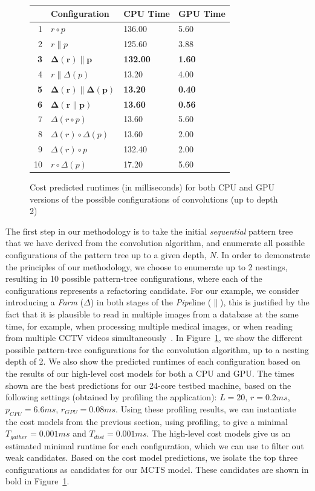 \documentclass[smallextended]{svjour3}
\begin{document}
\begin{figure}
\begin{center}
\begin{tabular}{| r | l | l | l |}
\hline
 & Configuration & CPU Time & GPU Time \tabularnewline
\hline
\hline
1 & $ r \circ p $ & 136.00 & 5.60  \tabularnewline
\hline
2 & $r \parallel p$ & 125.60 & 3.88 \tabularnewline
\hline
\textbf{3} & $ \mathbf{\Delta(r) \parallel p}$ & \textbf{132.00} & \textbf{1.60} \tabularnewline
\hline
4 & $ r \parallel \Delta(p)$ & 13.20 & 4.00 \tabularnewline
\hline
\textbf{5} & $\mathbf{\Delta(r) \parallel \Delta(p)}$ & \textbf{13.20} & \textbf{0.40}  \tabularnewline
\hline
\textbf{6} & $\mathbf{\Delta(r \parallel p)}$ & \textbf{13.60} & \textbf{0.56}  \tabularnewline
\hline
7 & $\Delta(r \circ p)$ & 13.60 & 5.60  \tabularnewline
\hline
8 & $\Delta(r) \circ \Delta(p)$ & 13.60 & 2.00  \tabularnewline
\hline
9 & $\Delta(r) \circ p$ & 132.40 & 2.00 \tabularnewline
\hline
10 & $r \circ \Delta(p)$ & 17.20 & 5.60 \tabularnewline
\hline
\end{tabular}
\caption{Cost predicted runtimes (in milliseconds) for both CPU and GPU versions of the possible configurations of convolutions (up to depth 2)}
\label{fig:configs}
\end{center}
\end{figure}
\noindent
The first step in our methodology is to take the initial
\emph{sequential} pattern tree that we have derived from the convolution
algorithm, and enumerate all possible configurations of the pattern tree
up to a given depth, $N$.  In order to demonstrate the principles of our
methodology, we choose to enumerate up to 2 nestings, resulting in 10
possible pattern-tree configurations, where each of the configurations
represents a refactoring candidate.  For our example, we consider
introducing a \emph{Farm} ($\Delta$) in both stages of the
\emph{Pipe}line ($\parallel$), this is justified by the fact that it is
plausible to read in multiple images from a database at the same time,
for example, when processing multiple medical images, or when reading
from multiple CCTV videos simultaneously~\cite{ediPhd}.  In
Figure~\ref{fig:configs}, we show the different possible pattern-tree
configurations for the convolution algorithm, up to a nesting depth of 2.
We also show the predicted runtimes of each configuration based on the
results of our high-level cost models for both a CPU and GPU. The times
shown are the best predictions for our 24-core testbed machine, based on the
following settings (obtained by profiling the application):
$L=20$, $r = 0.2ms $, $p_{CPU} = 6.6ms$, $r_{GPU} = 0.08ms$. Using these
profiling results, we can instantiate the cost models from the
previous section, using profiling, to give a minimal
$T_{gather}=0.001ms$ and $T_{dist}=0.001ms$.  The high-level cost models
give us an estimated minimal runtime for each configuration, which we can
use to filter out weak candidates. Based on the cost model predictions,
we isolate the top three configurations as candidates for our MCTS model.
These candidates are shown in bold in Figure~\ref{fig:configs}.
\end{document}
